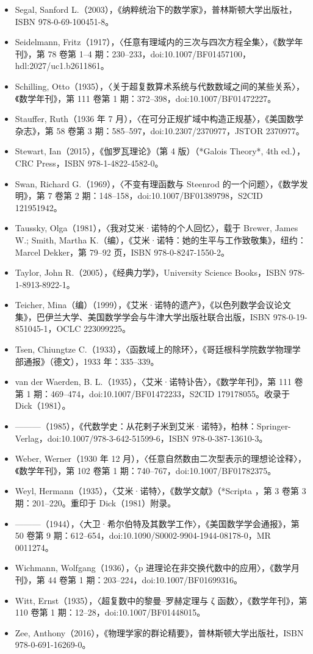\begin{itemize}
\item Segal, Sanford L.（2003），《纳粹统治下的数学家》，普林斯顿大学出版社，ISBN 978-0-69-100451-8。
\item Seidelmann, Fritz（1917），〈任意有理域内的三次与四次方程全集〉，《数学年刊》，第 78 卷第 1–4 期：230–233，doi:10.1007/BF01457100，hdl:2027/uc1.b2611861。
\item Schilling, Otto（1935），〈关于超复数算术系统与代数数域之间的某些关系〉，《数学年刊》，第 111 卷第 1 期：372–398，doi:10.1007/BF01472227。
\item Stauffer, Ruth（1936 年 7 月），〈在可分正规扩域中构造正规基〉，《美国数学杂志》，第 58 卷第 3 期：585–597，doi:10.2307/2370977，JSTOR 2370977。
\item Stewart, Ian（2015），《伽罗瓦理论》（第 4 版）（*Galois Theory*, 4th ed.），CRC Press，ISBN 978-1-4822-4582-0。
\item Swan, Richard G.（1969），〈不变有理函数与 Steenrod 的一个问题〉，《数学发明》，第 7 卷第 2 期：148–158，doi:10.1007/BF01389798，S2CID 121951942。
\item Taussky, Olga（1981），〈我对艾米·诺特的个人回忆〉，载于 Brewer, James W.; Smith, Martha K.（编），《艾米·诺特：她的生平与工作致敬集》，纽约：Marcel Dekker，第 79–92 页，ISBN 978-0-8247-1550-2。
\item Taylor, John R.（2005），《经典力学》，University Science Books，ISBN 978-1-8913-8922-1。
\item Teicher, Mina（编）（1999），《艾米·诺特的遗产》，《以色列数学会议论文集》，巴伊兰大学、美国数学学会与牛津大学出版社联合出版，ISBN 978-0-19-851045-1，OCLC 223099225。
\item Tsen, Chiungtze C.（1933），〈函数域上的除环〉，《哥廷根科学院数学物理学部通报》（德文），1933 年：335–339。
\item van der Waerden, B. L.（1935），〈艾米·诺特讣告〉，《数学年刊》，第 111 卷第 1 期：469–474，doi:10.1007/BF01472233，S2CID 179178055。收录于 Dick（1981）。
\item ———（1985），《代数学史：从花剌子米到艾米·诺特》，柏林：Springer-Verlag，doi:10.1007/978-3-642-51599-6，ISBN 978-0-387-13610-3。
\item Weber, Werner（1930 年 12 月），〈任意自然数由二次型表示的理想论诠释〉，《数学年刊》，第 102 卷第 1 期：740–767，doi:10.1007/BF01782375。
\item Weyl, Hermann（1935），〈艾米·诺特〉，《数学文献》（*Scripta ，第 3 卷第 3 期：201–220。重印于 Dick（1981）附录。
\item ———（1944），〈大卫·希尔伯特及其数学工作〉，《美国数学学会通报》，第 50 卷第 9 期：612–654，doi:10.1090/S0002-9904-1944-08178-0，MR 0011274。
\item Wichmann, Wolfgang（1936），〈p 进理论在非交换代数中的应用〉，《数学月刊》，第 44 卷第 1 期：203–224，doi:10.1007/BF01699316。
\item Witt, Ernst（1935），〈超复数中的黎曼–罗赫定理与 ζ 函数〉，《数学年刊》，第 110 卷第 1 期：12–28，doi:10.1007/BF01448015。
\item Zee, Anthony（2016），《物理学家的群论精要》，普林斯顿大学出版社，ISBN 978-0-691-16269-0。
\end{itemize}
